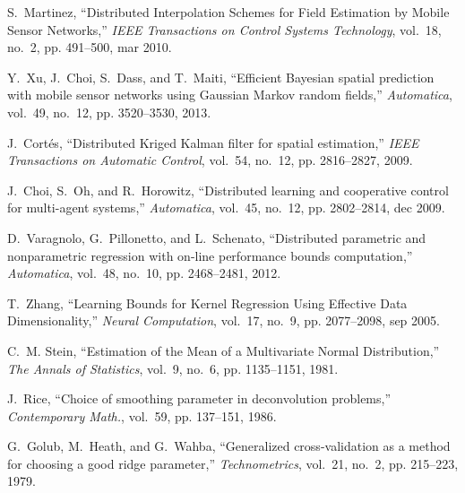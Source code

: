 \documentclass[10pt,twocolumn,twoside]{IEEEtran}					%
\theoremstyle	{plain}
\begin{document}
\begin{thebibliography}{10}
\BIBentryALTinterwordspacing
S.~Martinez, ``{Distributed Interpolation Schemes for Field Estimation by
  Mobile Sensor Networks},'' \emph{IEEE Transactions on Control Systems
  Technology}, vol.~18, no.~2, pp. 491--500, mar 2010.
\BIBentrySTDinterwordspacing

Y.~Xu, J.~Choi, S.~Dass, and T.~Maiti, ``{Efficient Bayesian spatial prediction
  with mobile sensor networks using Gaussian Markov random fields},''
  \emph{Automatica}, vol.~49, no.~12, pp. 3520--3530, 2013.

\BIBentryALTinterwordspacing
J.~Cort{\'{e}}s, ``{Distributed Kriged Kalman filter for spatial estimation},''
  \emph{IEEE Transactions on Automatic Control}, vol.~54, no.~12, pp.
  2816--2827, 2009.
\BIBentrySTDinterwordspacing

\BIBentryALTinterwordspacing
J.~Choi, S.~Oh, and R.~Horowitz, ``{Distributed learning and cooperative
  control for multi-agent systems},'' \emph{Automatica}, vol.~45, no.~12, pp.
  2802--2814, dec 2009.
\BIBentrySTDinterwordspacing

\BIBentryALTinterwordspacing
D.~Varagnolo, G.~Pillonetto, and L.~Schenato, ``{Distributed parametric and
  nonparametric regression with on-line performance bounds computation},''
  \emph{Automatica}, vol.~48, no.~10, pp. 2468--2481, 2012.
\BIBentrySTDinterwordspacing

\BIBentryALTinterwordspacing
T.~Zhang, ``{Learning Bounds for Kernel Regression Using Effective Data
  Dimensionality},'' \emph{Neural Computation}, vol.~17, no.~9, pp. 2077--2098,
  sep 2005.
\BIBentrySTDinterwordspacing

\BIBentryALTinterwordspacing
C.~M. Stein, ``{Estimation of the Mean of a Multivariate Normal
  Distribution},'' \emph{The Annals of Statistics}, vol.~9, no.~6, pp.
  1135--1151, 1981.
\BIBentrySTDinterwordspacing

J.~Rice, ``Choice of smoothing parameter in deconvolution problems,''
  \emph{Contemporary Math.}, vol.~59, pp. 137--151, 1986.

G.~Golub, M.~Heath, and G.~Wahba, ``Generalized cross-validation as a method
  for choosing a good ridge parameter,'' \emph{Technometrics}, vol.~21, no.~2,
  pp. 215--223, 1979.


\end{thebibliography}
\end{document}
